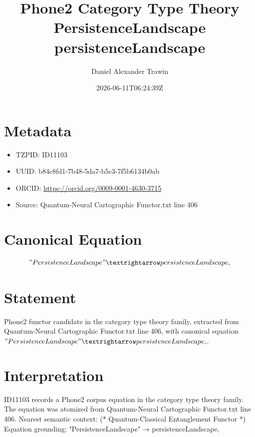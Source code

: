 \documentclass[11pt]{article}
\title{Phone2 Category Type Theory PersistenceLandscape persistenceLandscape}
\author{Daniel Alexander Trawin}
\date{2026-06-11T06:24:39Z}
\begin{document}
\maketitle
\section*{Metadata}
\begin{itemize}
\item TZPID: ID11103
\item UUID: b84c8fd1-7b48-5da7-b5c3-7f5b6134b0ab
\item ORCID: \url{https://orcid.org/0009-0001-4630-3715}
\item Source: Quantum-Neural Cartographic Functor.txt line 406
\end{itemize}
\section*{Canonical Equation}
\[
"PersistenceLandscape" → persistenceLandscape,
\]
\section*{Statement}
Phone2 functor candidate in the category type theory family, extracted from Quantum-Neural Cartographic Functor.txt line 406, with canonical equation $"PersistenceLandscape" → persistenceLandscape,$.
\section*{Interpretation}
ID11103 records a Phone2 corpus equation in the category type theory family. The equation was atomized from Quantum-Neural Cartographic Functor.txt line 406. Nearest semantic context: (* Quantum-Classical Entanglement Functor *) Equation grounding: "PersistenceLandscape" → persistenceLandscape,
\end{document}
